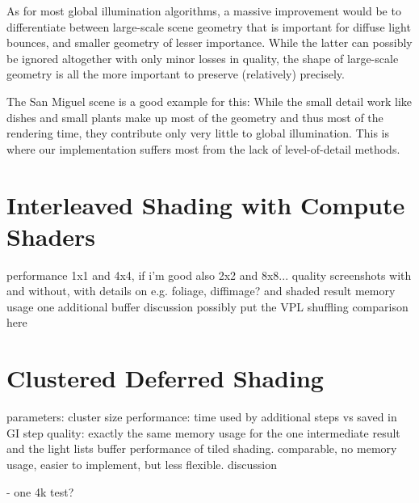 As for most global illumination algorithms, a massive improvement would be to differentiate between large-scale scene geometry that is important for diffuse light bounces, and smaller geometry of lesser importance. While the latter can possibly be ignored altogether with only minor losses in quality, the shape of large-scale geometry is all the more important to preserve (relatively) precisely.

The San Miguel scene is a good example for this: While the small detail work like dishes and small plants make up most of the geometry and thus most of the rendering time, they contribute only very little to global illumination. This is where our implementation suffers most from the lack of level-of-detail methods.




\section{Interleaved Shading with Compute Shaders}
\label{sec:results:interleavedShading}

\begin{outline}
\1 performance
\1 1x1 and 4x4, if i'm good also 2x2 and 8x8...
\1 quality
    \2 screenshots with and without, with details on e.g. foliage, diffimage? and shaded result
\1 memory usage
    \2 one additional buffer
\1 discussion
\1 possibly put the VPL shuffling comparison here

\end{outline}



\section{Clustered Deferred Shading}
\label{sec:results:clusteredShading}

\begin{outline}
\1 parameters: cluster size
\1 performance: time used by additional steps vs saved in GI step
\1 quality: exactly the same
\1 memory usage for the one intermediate result and the light lists buffer
\1 performance of tiled shading. comparable, no memory usage, easier to implement, but less flexible.
\1 discussion
\end{outline}




- one 4k test?
